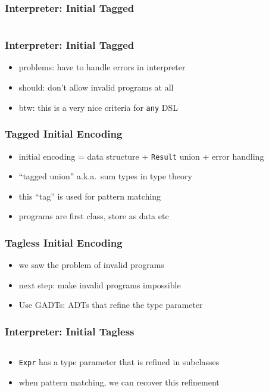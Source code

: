 \documentclass[aspectratio=169, hyperref={colorlinks, linkcolor=beamer@centricgreen}, urlcolor=links]{beamer}
\begin{document}
\begin{frame}[fragile]
  \frametitle{Interpreter: Initial Tagged}
  \inputminted[fontsize=\footnotesize]{scala}{snippets/initial-tagged-add.scala}
\end{frame}

\begin{frame}[fragile]
  \frametitle{Interpreter: Initial Tagged}
  \begin{itemize}
  \item problems: have to handle errors in interpreter
  \item should: don't allow invalid programs at all
  \item btw: this is a very nice criteria for \texttt{any} DSL
  \end{itemize}
\end{frame}

\begin{frame}
  \frametitle{Tagged Initial Encoding}
  \begin{itemize}
  \item initial encoding = data structure + \texttt{Result} union + error handling
  \item ``tagged union'' a.k.a.\ sum types in type theory
  \item this ``tag'' is used for pattern matching
  \item programs are first class, store as data etc
  \end{itemize}
\end{frame}

\begin{frame}
  \frametitle{Tagless Initial Encoding}
  \begin{itemize}
  \item we saw the problem of invalid programs
  \item next step: make invalid programs impossible
  \item Use GADTs: ADTs that refine the type parameter
  \end{itemize}
\end{frame}

\begin{frame}[fragile]
  \frametitle{Interpreter: Initial Tagless}
  \inputminted[fontsize=\footnotesize]{scala}{snippets/initial-tagless-expr.scala}
  \begin{itemize}
  \item \texttt{Expr} has a type parameter that is refined in subclasses
  \item when pattern matching, we can recover this refinement
  \end{itemize}
\end{frame}
\end{document}
